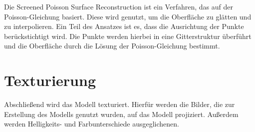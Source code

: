 \documentclass[./00PhotoBox.tex]{subfiles}
\begin{document}
Die Screened Poisson Surface Reconstruction ist ein Verfahren, das auf der Poisson-Gleichung basiert. Diese wird genutzt, um die Oberfläche zu glätten und zu interpolieren. Ein Teil des Ansatzes ist es, dass die Ausrichtung der Punkte berückstichtigt wird. Die Punkte werden hierbei in eine Gitterstruktur überführt und die Oberfläche durch die Lösung der Poisson-Gleichung bestimmt. \citep{spsr}

\section{Texturierung}
Abschließend wird das Modell texturiert. Hierfür werden die Bilder, die zur Erstellung des Modells genutzt wurden, auf das Modell projiziert. Außerdem werden Helligkeits- und Farbunterschiede ausgeglichenen. \citep[S. 54f]{opendronemap}

\biblio
\end{document}
